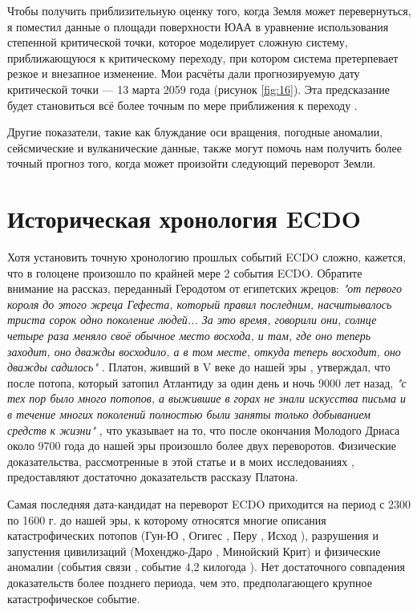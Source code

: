 \documentclass[10pt,twocolumn,letterpaper]{article}
\begin{document}
Чтобы получить приблизительную оценку того, когда Земля может перевернуться, я поместил данные о площади поверхности ЮАА в уравнение использования степенной критической точки, которое моделирует сложную систему, приближающуюся к критическому переходу, при котором система претерпевает резкое и внезапное изменение. Мои расчёты дали прогнозируемую дату критической точки — 13 марта 2059 года (рисунок \ref{fig:16}). Эта предсказание будет становиться всё более точным по мере приближения к переходу \cite{136}.

Другие показатели, такие как блуждание оси вращения, погодные аномалии, сейсмические и вулканические данные, также могут помочь нам получить более точный прогноз того, когда может произойти следующий переворот Земли.

\section{Историческая хронология ECDO}

Хотя установить точную хронологию прошлых событий ECDO сложно, кажется, что в голоцене произошло по крайней мере 2 события ECDO. Обратите внимание на рассказ, переданный Геродотом от египетских жрецов: \textit{"от первого короля до этого жреца Гефеста, который правил последним, насчитывалось триста сорок одно поколение людей... За это время, говорили они, солнце четыре раза меняло своё обычное место восхода, и там, где оно теперь заходит, оно дважды восходило, а в том месте, откуда теперь восходит, оно дважды садилось"} \cite{32}. Платон, живший в V веке до нашей эры \cite{111}, утверждал, что после потопа, который затопил Атлантиду за один день и ночь 9000 лет назад, \textit{"с тех пор было много потопов, а выжившие в горах не знали искусства письма и в течение многих поколений полностью были заняты только добыванием средств к жизни"} \cite{112}, что указывает на то, что после окончания Молодого Дриаса около 9700 года до нашей эры произошло более двух переворотов. Физические доказательства, рассмотренные в этой статье и в моих исследованиях \cite{2}, предоставляют достаточно доказательств рассказу Платона.

Самая последняя дата-кандидат на переворот ECDO приходится на период с 2300 по 1600 г. до нашей эры, к которому относятся многие описания катастрофических потопов (Гун-Ю \cite{113,114,115}, Огигес \cite{116,117}, Перу \cite{118,119}, Исход \cite{120}), разрушения и запустения цивилизаций (Мохенджо-Даро \cite{121}, Минойский Крит\cite{100,101}) и физические аномалии (события связи \cite{122}, событие 4,2 килогода \cite{90}). Нет достаточного совпадения доказательств более позднего периода, чем это, предполагающего крупное катастрофическое событие.
\end{document}
